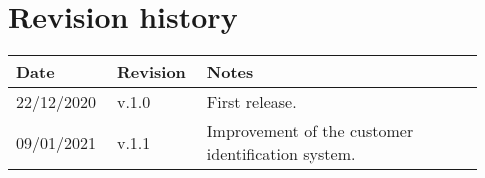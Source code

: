\chapter*{Revision history}

\begin{center}
	\begin{tabular}{@{}p{0.18\linewidth} p{0.18\linewidth} p{0.57\linewidth}@{}}
		\toprule
		\textbf{Date} & \textbf{Revision} & \textbf{Notes}\\
		\midrule
		22/12/2020 & v.1.0 & First release.\\
		09/01/2021 & v.1.1 & Improvement of the customer identification system.\\
		\bottomrule
	\end{tabular}
\end{center}